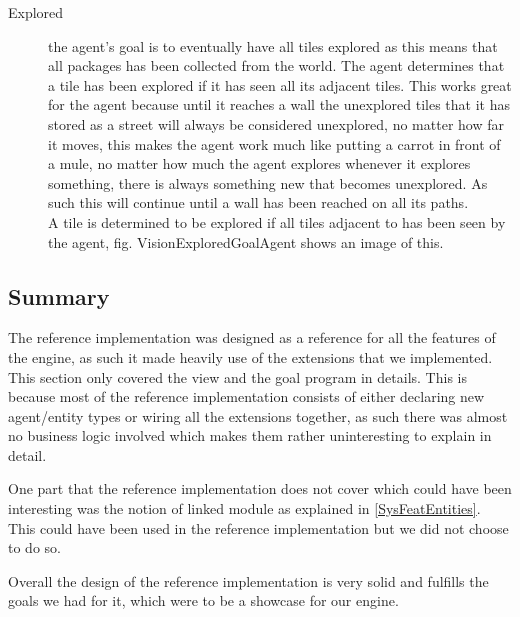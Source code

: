 \begin{description}
\item [{Explored}] the agent\textquoteright{}s goal is to eventually have
all tiles explored as this means that all packages has been collected
from the world. The agent determines that a tile has been explored
if it has seen all its adjacent tiles. This works great for the agent
because until it reaches a wall the unexplored tiles that it has stored
as a street will always be considered unexplored, no matter how far
it moves, this makes the agent work much like putting a carrot in
front of a mule, no matter how much the agent explores whenever it
explores something, there is always something new that becomes unexplored.
As such this will continue until a wall has been reached on all its
paths. \\
A tile is determined to be explored if all tiles adjacent to has been
seen by the agent, fig. VisionExploredGoalAgent shows an image of
this.
\end{description}

\subsection*{Summary}

The reference implementation was designed as a reference for all the
features of the engine, as such it made heavily use of the extensions
that we implemented. This section only covered the view and the goal
program in details. This is because most of the reference implementation
consists of either declaring new agent/entity types or wiring all
the extensions together, as such there was almost no business logic
involved which makes them rather uninteresting to explain in detail.

One part that the reference implementation does not cover which could
have been interesting was the notion of linked module as explained
in \ref{SysFeatEntities}. This could have been used in the reference
implementation but we did not choose to do so.

Overall the design of the reference implementation is very solid and
fulfills the goals we had for it, which were to be a showcase for
our engine.
